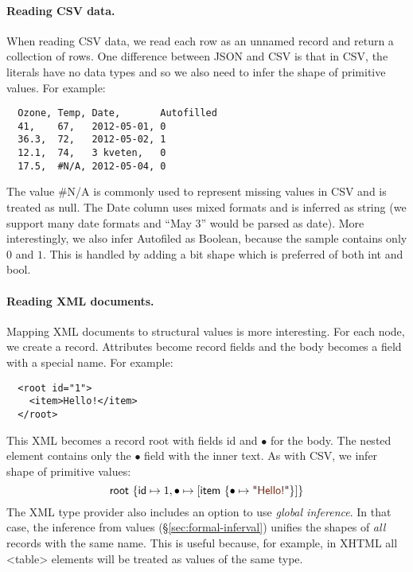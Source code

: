 \documentclass[10pt,nocopyrightspace]{sigplanconf}
\newcommand{\kvd}[1]{\textnormal{\textcolor{kvdclr}{\sffamily #1}}}
\newcommand{\str}[1]{\textnormal{\textcolor{strclr}{\sffamily "#1"}}}
\newcommand{\ident}[1]{\textnormal{\sffamily #1}}
\begin{document}
\paragraph{Reading CSV data.}
When reading CSV data, we read each row as an unnamed record and return a collection of rows.
One difference between JSON and CSV is that in CSV, the literals have no data types and so
we also need to infer the shape of primitive values. For example:
{\small{
\begin{verbatim}
  Ozone, Temp, Date,       Autofilled
  41,    67,   2012-05-01, 0
  36.3,  72,   2012-05-02, 1
  12.1,  74,   3 kveten,   0
  17.5,  #N/A, 2012-05-04, 0
\end{verbatim}
}}
\noindent
The value {\small\ttfamily \#N/A} is commonly used to represent missing values in CSV and is treated
as \kvd{null}. The \ident{Date} column uses mixed formats and is inferred as \ident{string}
(we support many date formats and ``May 3'' would be parsed as date). More interestingly,
we also infer \ident{Autofiled} as Boolean, because the sample contains only $0$ and $1$.
This is handled by adding a \ident{bit} shape which is preferred of both \ident{int} and \ident{bool}.

\paragraph{Reading XML documents.}
Mapping XML documents to structural values is more interesting. For each node, we
create a record. Attributes become record fields and the body becomes a field with a special
name. For example:
{\small{
\begin{verbatim}
  <root id="1">
    <item>Hello!</item>
  </root>
\end{verbatim}
}}
\noindent
This XML becomes a record \ident{root} with fields \ident{id} and $\bullet$ for the body.
The nested element contains only the $\bullet$ field with the inner text. As with CSV, we
infer shape of primitive values:
\begin{equation*}
\ident{root}~\{ \ident{id} \mapsto 1, \bullet \mapsto [ \ident{item}~\{ \bullet \mapsto \str{Hello!} \}] \}
\end{equation*}
The XML type provider also includes an option to use \emph{global inference}. In that case,
the inference from values (\S\ref{sec:formal-inferval}) unifies the shapes of \emph{all} records with the
same name. This is useful because, for example, in XHTML all {\small\ttfamily <table>} elements
will be treated as values of the same type.
\end{document}
